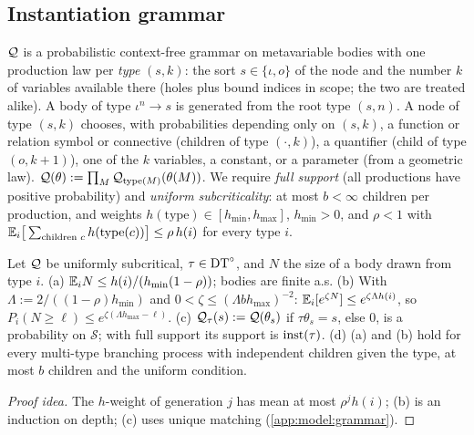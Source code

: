 \subsection{Instantiation grammar}\label{sec:model:grammar}

\begin{definition}\label{def:model:grammar}
$\mathcal{Q}$ is a probabilistic context-free grammar on metavariable bodies with one production law per \emph{type} $(s,k)$: the sort $s\in\{\iota,o\}$ of the node and the number $k$ of variables available there (holes plus bound indices in scope; the two are treated alike). A body of type $\iota^n\to s$ is generated from the root type $(s,n)$. A node of type $(s,k)$ chooses, with probabilities depending only on $(s,k)$, a function or relation symbol or connective (children of type $(\cdot,k)$), a quantifier (child of type $(o,k+1)$), one of the $k$ variables, a constant, or a parameter (from a geometric law). $\mathcal{Q}(\theta):=\prod_M\mathcal{Q}_{\mathrm{type}(M)}(\theta(M))$. We require \emph{full support} (all productions have positive probability) and \emph{uniform subcriticality}: at most $b<\infty$ children per production, and weights $h(\text{type})\in[h_{\min},h_{\max}]$, $h_{\min}>0$, and $\rho<1$ with $\mathbb{E}_i\big[\sum_{\text{children }c}h(\mathrm{type}(c))\big]\le\rho\,h(i)$ for every type $i$.
\end{definition}

\begin{lemma}\label{lem:model:grammar}
Let $\mathcal{Q}$ be uniformly subcritical, $\tau\in\mathrm{DT}^{\circ}$, and $N$ the size of a body drawn from type $i$.
(a) $\mathbb{E}_iN\le h(i)/(h_{\min}(1-\rho))$; bodies are finite a.s.
(b) With $\Lambda:=2/((1-\rho)h_{\min})$ and $0<\zeta\le(\Lambda bh_{\max})^{-2}$: $\mathbb{E}_i[e^{\zeta N}]\le e^{\zeta\Lambda h(i)}$, so $P_i(N\ge\ell)\le e^{\zeta(\Lambda h_{\max}-\ell)}$.
(c) $\mathcal{Q}_\tau(s):=\mathcal{Q}(\theta_s)$ if $\tau\theta_s=s$, else $0$, is a probability on $\mathcal S$; with full support its support is $\mathrm{inst}(\tau)$.
(d) (a) and (b) hold for every multi-type branching process with independent children given the type, at most $b$ children and the uniform condition.
\end{lemma}

\begin{proof}[Proof idea]
The $h$-weight of generation $j$ has mean at most $\rho^jh(i)$; (b) is an induction on depth; (c) uses unique matching (\cref{app:model:grammar}).
\end{proof}

